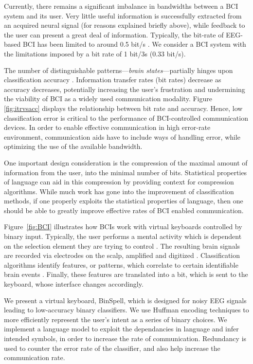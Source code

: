 \documentclass[12pt,titlepage]{article}
\begin{document}
Currently, there remains a significant imbalance in bandwidths between a BCI system and its 
user. Very little useful information is successfully extracted from an acquired neural signal (for 
reasons explained briefly above), while feedback to the user can present a great deal of 
information.  Typically, the bit-rate of EEG-based BCI has been limited to around 0.5 bit/s \cite{millan2004}.  We consider a BCI system with the limitations imposed by a bit rate of 1 bit/3s (0.33 bit/s).

The number of distinguishable patterns---\emph{brain states}---partially hinges upon classification 
accuracy \cite{lotte_review_2007}.  Information transfer rates (bit rates) decrease as accuracy decreases, potentially increasing the user's frustration and  undermining the viability of BCI as a widely used communication modality.  Figure \ref{fig:itrvsacc} displays the relationship between bit rate and accuracy.  Hence, low classification error is critical to the performance of BCI-controlled communication devices.  In order to enable effective communication in high error-rate environment, communication aids have to include ways of handling error, while optimizing the use of the available bandwidth.

One important design consideration is the compression of the maximal amount of information 
from the user, into the minimal number of bits.  Statistical properties of language can aid in this 
compression by providing context for compression algorithms.  While much work has gone 
into the improvement of classification methods, if one properly exploits the statistical 
properties of language, then one should be able to greatly improve effective rates of BCI 
enabled communication. 

Figure~\ref{fig:BCI} illustrates how BCIs work with virtual keyboards controlled by binary input.  Typically, the user performs a mental activity which is dependent on the selection element they are trying to control \cite{molina_direct}.  The resulting brain signals are recorded via electrodes on the scalp, amplified and digitized \cite{lotte_review_2007}.  Classification algorithms identify features, or patterns, which correlate to certain identifiable brain events \cite{lotte_review_2007}.  Finally, these features are translated into a bit, which is sent to the keyboard, whose interface changes accordingly.

We present a virtual keyboard, BinSpell, which is designed for noisy EEG signals leading to low-accuracy binary classifiers.  We use Huffman encoding techniques to more efficiently represent the user's intent as a series of binary choices.  We implement a language model to exploit the dependancies in language and infer intended symbols, in order to increase the rate of communication. Redundancy is used to counter the error rate of the classifier, and also help increase the communication rate.
\end{document}
